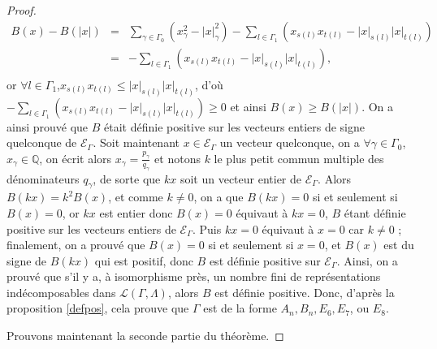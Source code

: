 \documentclass[a4paper,11pt]{article}
\newcommand{\EG}{\mathscr{E}_\Gamma}
\begin{document}
\begin{proof}
	\begin{eqnarray*}
		B(x)-B(|x|)&=&\sum_{\gamma\in\Gamma_0}\left(x_\gamma^2-|x|_{\gamma}^2\right)-\sum_{l\in\Gamma_1}\left(x_{s(l)}x_{t(l)}-|x|_{s(l)}|x|_{t(l)}\right)\\
		&=&-\sum_{l\in\Gamma_1}\left(x_{s(l)}x_{t(l)}-|x|_{s(l)}|x|_{t(l)}\right),\\
	\end{eqnarray*}
	or $\forall l\in\Gamma_1$,$x_{s(l)}x_{t(l)}\leq|x|_{s(l)}|x|_{t(l)}$, d'où $-\sum_{l\in\Gamma_1}\left(x_{s(l)}x_{t(l)}-|x|_{s(l)}|x|_{t(l)}\right)\geq0$ et ainsi $B(x)\geq B(|x|)$. On a ainsi prouvé que $B$ était définie positive sur les vecteurs entiers de signe quelconque de $\EG$. Soit maintenant $x\in\EG$ un vecteur quelconque, on a $\forall\gamma\in\Gamma_0$, $x_{\gamma}\in\mathbb Q$, on écrit alors $x_\gamma=\frac{p_\gamma}{q_\gamma}$ et notons $k$ le plus petit commun multiple des dénominateurs $q_\gamma$, de sorte que $kx$ soit un vecteur entier de $\EG$. Alors $B(kx)=k^2B(x)$, et comme $k\neq0$, on a que $B(kx)=0$ si et seulement si $B(x)=0$, or $kx$ est entier donc $B(x)=0$ équivaut à $kx=0$, $B$ étant définie positive sur les vecteurs entiers de $\EG$. Puis $kx=0$ équivaut à $x=0$ car $k\neq0$ ; finalement, on a prouvé que $B(x)=0$ si et seulement si $x=0$, et $B(x)$ est du signe de $B(kx)$ qui est positif, donc $B$ est définie positive sur $\EG$. Ainsi, on a prouvé que s'il y a, à isomorphisme près, un nombre fini de représentations indécomposables dans $\mathscr L(\Gamma,\Lambda)$, alors $B$ est définie positive. Donc, d'après la proposition \ref{defpos}, cela prouve que $\Gamma$ est de la forme $A_n,B_n,E_6,E_7$, ou $E_8$.

	Prouvons maintenant la seconde partie du théorème.
\end{proof}
\clearpage


\end{document}

